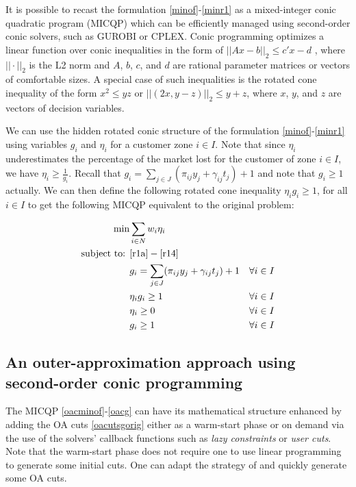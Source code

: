 \documentclass[num-refs]{wiley-networks}
\begin{document}
It is possible to recast the formulation \eqref{minof}-\eqref{minr1} as a mixed-integer conic quadratic program (MICQP) which can be efficiently managed using second-order conic solvers, such as GUROBI or CPLEX. Conic programming optimizes a linear function
over conic inequalities in the form of $||Ax-b||_2 \leq c'x - d$ \cite{bental2001}, where $||\cdot||_2$ is the L2 norm and $A$, $b$, $c$, and $d$ are rational parameter matrices or vectors of comfortable sizes.
A special case of such inequalities is the rotated cone inequality of the form $x^2 \leq y z$ or $||(2x,y-z)||_2 \leq y + z$, where $x$, $y$, and $z$ are vectors of decision variables.

We can use the hidden rotated conic structure of the formulation \eqref{minof}-\eqref{minr1} using variables $g_i$ and $\eta_i$
for a customer zone $i\in I$. Note that since $\eta_i$ underestimates
the percentage of the market lost for the customer of zone $i\in I$, we have
$\eta_i \geq \frac{1}{g_i}$. Recall that $g_i = \sum_{j \in J} (\pi_{ij} y_j + \gamma_{ij} t_j) + 1$ and note that $g_i \geq 1$ actually. We can then define
the following rotated cone inequality $\eta_i g_i \geq 1$, for all $i\in I$ to
get the following MICQP equivalent to the original problem:

\begin{align}
    \label{oacminof} \min & \sum_{i \in N}w_i \eta_i && \\
    \label{oacminr1} \text{subject to: } & \eqref{r1a}-\eqref{r14} && \\
    \label{oacgr} & g_i = \sum_{j \in J} (\pi_{ij} y_j + \gamma_{ij} t_j) + 1 && \forall i \in I\\
    \label{oaconic} & \eta_i g_i \geq 1 && \forall i \in I\\
    \label{oaetacorig} & \eta_i \geq 0 && \forall i \in I  \\
    \label{oacg} & g_i \geq 1 && \forall i \in I 
\end{align}

\subsection{An outer-approximation approach using second-order conic programming }

The MICQP \eqref{oacminof}-\eqref{oacg} can have its mathematical structure
enhanced by adding the OA cuts \eqref{oacutsgorig} either as a warm-start phase
or on demand via the use of the solvers' callback functions such as \textit{lazy constraints} or \textit{user cuts}. Note that the warm-start phase does not require one
to use linear programming to generate some initial cuts. One can adapt
the strategy of \cite[Section 3.1]{elhedhli2005} and quickly generate some OA cuts.
\end{document}
